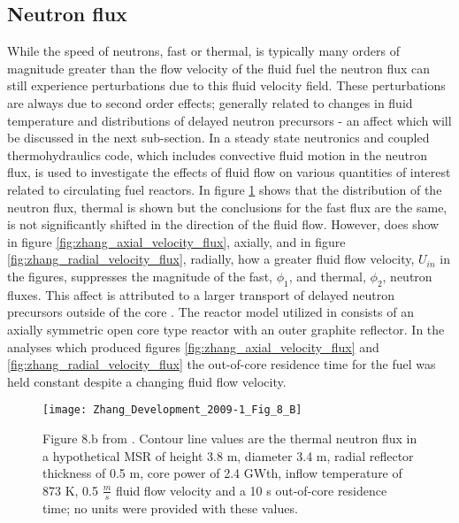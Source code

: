 \documentclass[review]{elsarticle}
\begin{document}
\subsection{Neutron flux} \label{ssec:flux}
While the speed of neutrons, fast or thermal, is typically many orders of magnitude greater than
the flow velocity of the fluid fuel the neutron flux can still experience
perturbations due to this fluid velocity field. These perturbations are always
due to second order effects; generally related to changes in fluid temperature
and distributions of delayed neutron precursors - an affect which will be
discussed in the next sub-section. In \cite{zhang_development_2009-1} a steady
state neutronics and coupled thermohydraulics code, which includes convective
fluid motion in the neutron flux, is used to investigate the effects of fluid
flow on various quantities of interest related to circulating fuel reactors. In
figure \ref{fig:zhang_2d_flux} \cite{zhang_development_2009-1} shows that the
distribution of the neutron flux, thermal is shown but the conclusions for the fast flux are the same, is not significantly shifted in the direction
of the fluid flow. However, \cite{zhang_development_2009-1} does show in figure \ref{fig:zhang_axial_velocity_flux}, axially, and in figure \ref{fig:zhang_radial_velocity_flux}, radially, how a greater fluid flow
 velocity, $U_{in}$ in the figures, suppresses the magnitude of the fast, $\phi_{1}$, and thermal, $\phi_{2}$, neutron fluxes. This affect is
 attributed to a larger transport of delayed neutron precursors outside of the core \cite{zhang_development_2009-1}. The reactor model
 utilized in \cite{zhang_development_2009-1} consists of an axially symmetric
 open core type reactor with an outer graphite reflector. In the analyses which
 produced figures \ref{fig:zhang_axial_velocity_flux} and \ref{fig:zhang_radial_velocity_flux} the
 out-of-core residence time for the fuel was held constant despite a changing
 fluid flow velocity.

\begin{figure}[h]
   \centering
   \texttt{[image: Zhang\_Development\_2009-1\_Fig\_8\_B]}
   \caption{Figure 8.b from \cite{zhang_development_2009-1}. Contour line
    values are the thermal neutron flux in a hypothetical MSR of height 3.8 m, diameter 3.4 m,
    radial reflector thickness of 0.5 m, core power of 2.4 GWth, inflow temperature of 873 K,
    0.5 $\frac{m}{s}$ fluid flow
    velocity and a 10 s out-of-core residence time; no units were provided with these values.} 
   \label{fig:zhang_2d_flux}
\end{figure}
\end{document}
